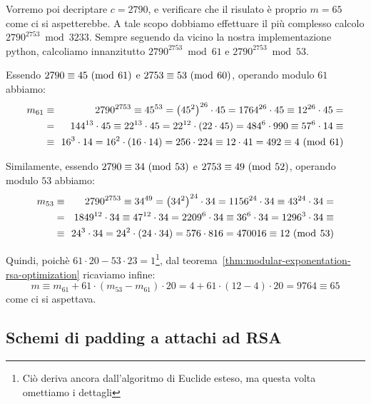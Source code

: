 \documentclass[pdflatex,11pt,a4paper,oneside]{article}
\newcommand{\p}[1]{\left({#1}\right)}
\newcommand{\congruent}[0]{\equiv}
\newcommand{\mmodop}[0]{\ensuremath{\operatorname{mod}}}
\newcommand{\mmod}[1]{\ensuremath{\allowbreak\ (\mmodop\:{#1})}}
\newcommand{\rem}[2]{\ensuremath{{#1}\:\mmodop\:{#2}}}
\begin{document}
\medskip
Vorremo poi decriptare $c = 2790$, e verificare che il risulato \`e
proprio $m = 65$ come ci si aspetterebbe. A tale scopo dobbiamo
effettuare il pi\`u complesso calcolo $\rem{2790^{2753}}{3233}$.
Sempre seguendo da vicino la nostra implementazione python, calcoliamo
innanzitutto $\rem{2790^{2753}}{61}$ e $\rem{2790^{2753}}{53}$.

Essendo $2790 \congruent 45 \mmod{61}$ e $2753 \congruent 53 \mmod{60}$,
operando modulo $61$ abbiamo:
\begin{eqnarray*}
m_{61}
  & \congruent\!\! &
    2790^{2753} \congruent {45}^{53} = \p{{45}^2}^{26} \cdot 45
    = 1764^{26} \cdot 45  \congruent 12^{26} \cdot 45 =
  \\
  & =\!\! &
    144^{13} \cdot 45 \congruent 22^{13} \cdot 45
    = 22^{12} \cdot \p{22 \cdot 45} = {484}^6 \cdot 990
    \congruent {57}^6 \cdot 14 \congruent
  \\
  &\congruent\!\! &
    16^3 \cdot 14 = 16^2 \cdot \p{16 \cdot 14} = 256 \cdot 224
    \congruent 12 \cdot 41 = 492 \congruent 4 \mmod{61}
\end{eqnarray*}

\noindent
Similamente, essendo $2790 \congruent 34 \mmod{53}$ e
$2753 \congruent 49 \mmod{52}$, operando modulo $53$ abbiamo:
\begin{eqnarray*}
m_{53}
  & \congruent\!\! &
    2790^{2753} \congruent {34}^{49} = \p{{34}^2}^{24} \cdot 34 =
    1156^{24} \cdot 34 \congruent 43^{24} \cdot 34 =
  \\
  & =\!\! &
    1849^{12} \cdot 34 \congruent 47^{12} \cdot 34 = {2209}^6 \cdot 34
    \congruent 36^6 \cdot 34 = 1296^3 \cdot 34 \congruent
  \\
  & \congruent\!\! &
    24^3 \cdot 34 = 24^2 \cdot \p{24 \cdot 34} = 576 \cdot 816 = 470016
    \congruent 12 \mmod{53}
\end{eqnarray*}

\noindent
Quindi, poich\`e $61 \cdot 20 - 53 \cdot 23 = 1$\footnote{Ci\`o deriva
ancora dall'algoritmo di Euclide esteso, ma questa volta omettiamo i
dettagli}, dal teorema~\eqref{thm:modular-exponentation-rsa-optimization}
ricaviamo infine:
\begin{displaymath}
  m \congruent m_{61} + 61 \cdot \p{m_{53} - m_{61}} \cdot 20
    = 4 + 61 \cdot \p{12 - 4} \cdot 20 = 9764 \congruent 65
\end{displaymath}
come ci si aspettava.

\subsection{Schemi di padding a attachi ad RSA}
\end{document}
